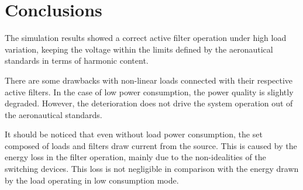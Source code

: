 \section{Conclusions}

The simulation results showed a correct active filter operation under high load variation, keeping the voltage within the limits defined by the aeronautical standards in terms of harmonic content.

There are some drawbacks with non-linear loads connected with their respective active filters. In the case of low power consumption, the power quality is slightly degraded. However, the deterioration does not drive the system operation out of the aeronautical standards.

It should be noticed that even without load power consumption, the set composed of loads and filters draw current from the source. This is caused by the energy loss in the filter operation, mainly due to the non-idealities of the switching devices. This loss is not negligible in comparison with the energy drawn by the load operating in low consumption mode.
